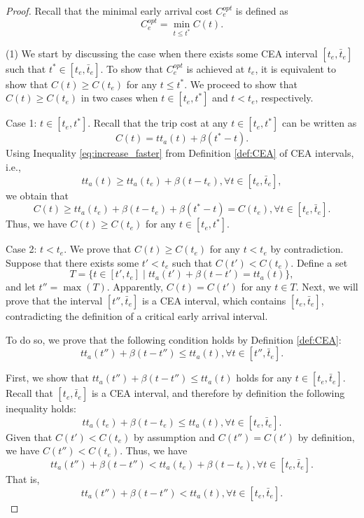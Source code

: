 \begin{proof}
Recall that the minimal early arrival cost  $C_e^{opt}$ is defined as $$C_e^{opt} = \min_{t \le t^*} C(t).$$

(1) We start by discussing the case when there exists some CEA interval $[t_e, \bar{t}_e]$ such that  $t^* \in [t_e, \bar{t}_e]$.  To show that $C_e^{opt}$ is achieved at $t_e$, it is equivalent to show that $C(t) \ge C(t_e) $ for any $t \le t^*$. We proceed to show that $C(t) \ge C(t_e)$ in two cases when $t \in [t_e, t^*]$ and $t < t_e$, respectively.    

Case 1: $t \in [t_e, t^*]$.  Recall that the trip cost at any $t \in [t_e, t^*]$ can be written as 
$$C(t) = tt_a(t) + \beta (t^* - t).$$
Using Inequality \eqref{eq:increase_faster} from Definition \ref{def:CEA} of CEA intervals, i.e., $$tt_a(t ) \ge tt_a(t_e)  + \beta (t - t_e ), \forall t \in [t_e, \bar t_e],$$ we obtain that 
$$C(t) \ge tt_a(t_e) + \beta (t - t_e ) + \beta (t^* - t) = C(t_e), \forall t \in [t_e, \bar t_e].$$
Thus, we have $C(t) \ge C(t_e) $ for any $t \in [t_e, t^*]$.

Case 2: $t < t_e$. We prove that $C(t) \ge C(t_e) $ for any $t < t_e$ by contradiction. Suppose that there exists some $t'< t_e$ such that $C(t') < C(t_e)$.  Define a set 
\begin{equation}\label{eq:def_T}
    T = \{t \in [t', t_e] \mid tt_a(t')  + \beta (t - t' ) =  tt_a(t )\},
\end{equation}
and let $t'' = \max(T).$ Apparently, $C(t) = C(t')$ for any $t \in T$. Next, we will prove that the interval $[t'', \bar{t}_e]$ is a CEA interval, which contains $[t_e, \bar{t}_e]$, contradicting the definition of a critical early arrival interval.


To do so, we prove that the following condition holds by Definition \ref{def:CEA}:
$$ tt_a(t'')  + \beta (t - t'' ) \le  tt_a(t ), \forall t \in [t'', \bar t_e].$$ 

First, we show that $ tt_a(t'')  + \beta (t - t'' ) \le  tt_a(t )$ holds for any $ t \in [t_e, \bar t_e] $. Recall that $[t_e, \bar t_e]$ is a CEA interval, and therefore by definition the following inequality holds:
$$tt_a(t_e)  + \beta (t - t_e ) \le  tt_a(t ), \forall t \in [t_e, \bar t_e].$$ 
Given that $C(t') < C(t_e)$ by assumption and $C(t'') = C(t')$ by definition, we have $C(t'') < C(t_e)$.  Thus, we have $$tt_a(t'')  + \beta (t - t'' ) < tt_a(t_e)  + \beta (t - t_e ), \forall t \in [t_e, \bar t_e]. $$
That is, $$tt_a(t'')  + \beta (t - t'' ) <  tt_a(t ), \forall t \in [t_e, \bar t_e].$$


\end{proof}
